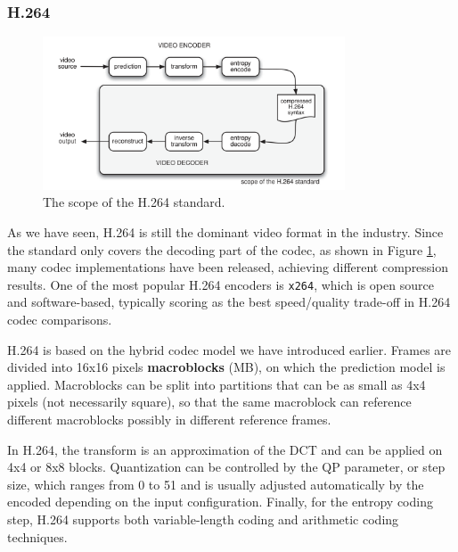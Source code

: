 
\subsubsection{H.264}
\label{sec:bg/compression/codecs/h264}

\begin{figure}
	\centering
	
	\includegraphics[width=0.8\textwidth]{res/h264_scope.png}
	
	\caption{The scope of the H.264 standard.}
	\label{fig:h264_scope}
\end{figure}

As we have seen, H.264 is still the dominant video format in the industry. Since the standard only covers the decoding part of the codec, as shown in Figure \ref{fig:h264_scope}, many codec implementations have been released, achieving different compression results. One of the most popular H.264 encoders is \texttt{x264}, which is open source and software-based, typically scoring as the best speed/quality trade-off in H.264 codec comparisons.\cite{msu2021}

H.264 is based on the hybrid codec model we have introduced earlier. Frames are divided into 16x16 pixels \textbf{macroblocks} (MB), on which the prediction model is applied. Macroblocks can be split into partitions that can be as small as 4x4 pixels (not necessarily square), so that the same macroblock can reference different macroblocks possibly in different reference frames.

In H.264, the transform is an approximation of the DCT and can be applied on 4x4 or 8x8 blocks. Quantization can be controlled by the QP parameter, or step size, which ranges from 0 to 51 and is usually adjusted automatically by the encoded depending on the input configuration. Finally, for the entropy coding step, H.264 supports both variable-length coding and arithmetic coding techniques.


